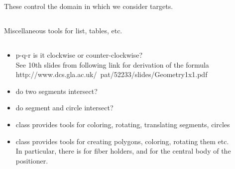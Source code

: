 \documentclass[12pt]{article}
\begin{document}
These control the domain in which we consider targets. 




\subsection{}
Miscellaneous tools for list, tables, etc.
\subsection{}
\begin{itemize}
\item{} p-q-r is it clockwise or counter-clockwise?\\
 See 10th slides from following link for derivation of the formula\\
    http://www.dcs.gla.ac.uk/~pat/52233/slides/Geometry1x1.pdf
\item{}do two segments intersect?
\item{}do segment and circle intersect?
\item {} class provides tools for coloring, rotating, translating segments, circles
\item {} class provides tools for creating polygons, coloring, rotating them etc.\\
 In particular, there is  for fiber holders, and 
 for the central body of the positioner.

\end{itemize}
\end{document}
